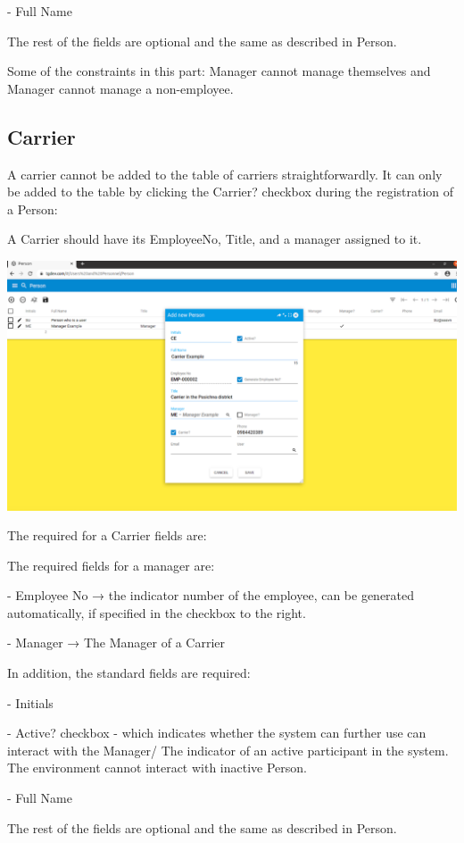 - Full Name

The rest of the fields are optional and the same as described in Person.

Some of the constraints in this part: Manager cannot manage themselves and Manager cannot manage a non-employee.

\subsection{Carrier}

A carrier cannot be added to the table of carriers straightforwardly. It can only be added to the table by clicking the Carrier? checkbox during the registration of a Person:

A Carrier should have its EmployeeNo, Title, and a manager assigned to it. 

\includegraphics[width=\textwidth]{sections/01-chapter/images/carrier1.png}

The required for a Carrier fields are: 

The required fields for a manager are:

- Employee No → the indicator number of the employee, can be generated automatically, if specified in the checkbox to the right.

- Manager → The Manager of a Carrier

In addition, the standard fields are required:

- Initials

- Active? checkbox - which indicates whether the system can further use can interact with the Manager/ The indicator of an active participant in the system. The environment cannot interact with inactive Person.

- Full Name

The rest of the fields are optional and the same as described in Person.

